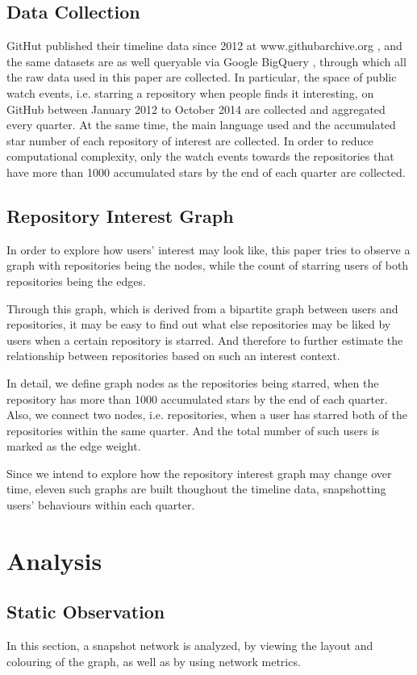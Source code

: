 \documentclass[11pt]{article}
\begin{document}
\subsection{Data Collection}
GitHut published their timeline data since 2012 at www.githubarchive.org \cite{githubarchive}, and the same datasets are as well queryable via Google BigQuery \cite{googlebigquery}, through which all the raw data used in this paper are collected. 
In particular, the space of public watch events, i.e. starring a repository when people finds it interesting, on GitHub between January 2012 to October 2014 are collected and aggregated every quarter.
At the same time, the main language used and the accumulated star number of each repository of interest are collected.
In order to reduce computational complexity, only the watch events towards the repositories that have more than 1000 accumulated stars by the end of each quarter are collected.

\subsection{Repository Interest Graph}
In order to explore how users' interest may look like, this paper tries to observe a graph with repositories being the nodes, while the count of starring users of both repositories being the edges. 

Through this graph, which is derived from a bipartite graph between users and repositories, it may be easy to find out what else repositories may be liked by users when a certain repository is starred. And therefore to further estimate the relationship between repositories based on such an interest context.

In detail, we define graph nodes as the repositories being starred, when the repository has more than 1000 accumulated stars by the end of each quarter.
Also, we connect two nodes, i.e. repositories, when a user has starred both of the repositories within the same quarter. And the total number of such users is marked as the edge weight.

Since we intend to explore how the repository interest graph may change over time, eleven such graphs are built thoughout the timeline data, snapshotting users' behaviours within each quarter.

\section{Analysis}
\subsection{Static Observation}
In this section, a snapshot network is analyzed, by viewing the layout and colouring of the graph, as well as by using network metrics.
\end{document}
